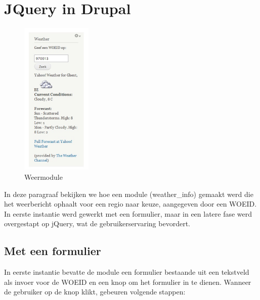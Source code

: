\section{JQuery in Drupal} \label{jQuery}

\begin{figure}
\vspace{-40pt}
\hspace{-10pt}
\centering
\includegraphics[width=0.3\textwidth]{fig/weermodule}
\vspace{-30pt}
\hspace{-10pt}
\centering
\caption{Weermodule}
\label{fig:weermodule}
\vspace{-70pt}
\end{figure}

In deze paragraaf bekijken we hoe een module (weather\_info) gemaakt werd die het weerbericht ophaalt voor een regio naar keuze, aangegeven door een WOEID. In eerste instantie werd gewerkt met een formulier, maar in een latere fase werd overgestapt op jQuery, wat de gebruikerservaring bevordert.

\subsection{Met een formulier}

In eerste instantie bevatte de module een formulier bestaande uit een tekstveld als invoer voor de WOEID en een knop om het formulier in te dienen.
Wanneer de gebruiker op de knop klikt, gebeuren volgende stappen:


